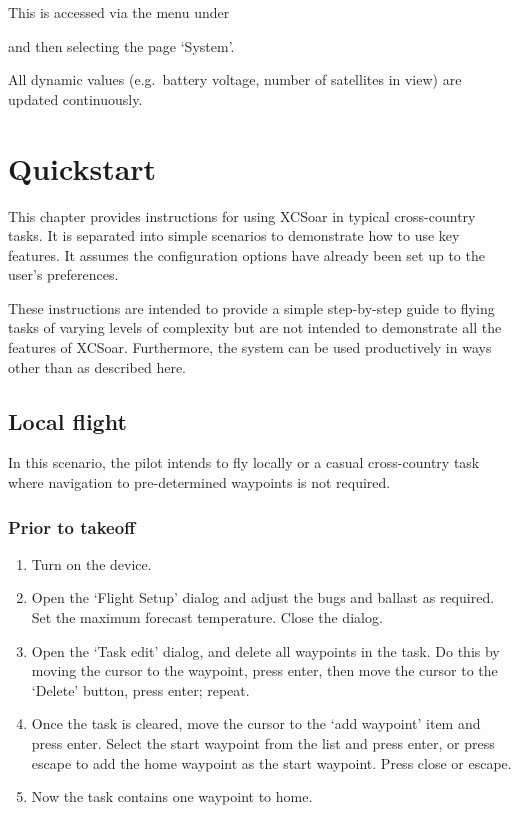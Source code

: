 \documentclass[a4paper,12pt]{refrep}
\begin{document}
This is accessed via the menu under 
\begin{quote}
\blink{}
\end{quote}
and then selecting the page `System'.

All dynamic values (e.g.\ battery voltage, number of satellites in
view) are updated continuously.

\chapter{Quickstart}\label{cha:quickstart}

This chapter provides instructions for using XCSoar in typical
cross-country tasks.  It is separated into simple scenarios to
demonstrate how to use key features.  It assumes the configuration
options have already been set up to the user's preferences.

These instructions are intended to provide a simple step-by-step guide
to flying tasks of varying levels of complexity but are not intended
to demonstrate all the features of XCSoar.  Furthermore, the system
can be used productively in ways other than as described here.

\section{Local flight}\label{sec:local-flight}

In this scenario, the pilot intends to fly locally or a casual
cross-country task where navigation to pre-determined waypoints is not
required.

\subsection*{Prior to takeoff}
\begin{enumerate}
\item Turn on the device.
\item Open the `Flight Setup' dialog and adjust the bugs and ballast as
required. Set the maximum forecast temperature.  Close the dialog.
\item Open the `Task edit' dialog, and delete all waypoints in the task.  Do this by moving the cursor to the waypoint, press enter, then move the cursor to the `Delete' button, press enter; repeat.
\item Once the task is cleared, move the cursor to the `add waypoint' item and press enter.  Select the start waypoint from the list and press enter, or press escape to add the home waypoint as the start waypoint.  Press close or escape.
\item Now the task contains one waypoint to home.
\end{enumerate}
\end{document}
